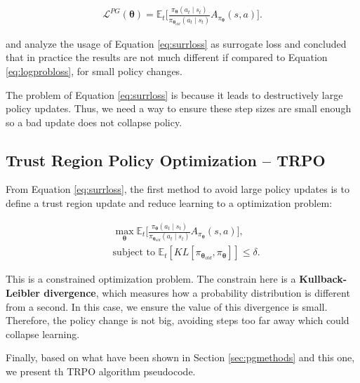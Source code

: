 \begin{eqnarray}\label{eq:surrloss}
\mathcal{L}^{PG}(\boldsymbol{\theta}) = \mathbb{E}_{t}\Big[\frac{\pi_{\boldsymbol{\theta}}(a_{t} \mid s_{t})}{\pi_{\boldsymbol{\theta}_{old}}(a_{t} \mid s_{t})}A_{\pi_{\boldsymbol{\theta}}}(s,a)\Big].
\end{eqnarray}

\citeauthor{trpo} and \citeauthor{Kakade02approximatelyoptimal} analyze the usage of Equation \eqref{eq:surrloss} as surrogate loss and concluded that in practice the results are not much different if compared to Equation \ref{eq:logprobloss}, for small policy changes.

The problem of Equation \eqref{eq:surrloss} is because it leads to destructively large policy updates. Thus, we need a way to ensure these step sizes are small enough so a bad update does not collapse policy.
\subsection{Trust Region Policy Optimization -- TRPO}

From Equation \ref{eq:surrloss}, the first method to avoid large policy updates is to define a trust region update and reduce learning to a optimization problem:

\begin{align}\label{eq:tr}
&  \max_{\boldsymbol{\theta}}  \mathbb{E}_{t}\Big[\frac{\pi_{\boldsymbol{\theta}}(a_{t} \mid s_{t})}{\pi_{\boldsymbol{\theta}_{old}}(a_{t} \mid s_{t})}A_{\pi_{\boldsymbol{\theta}}}(s,a)\Big],\\ &  \text{subject to }  \mathbb{E}_{t}[KL[\pi_{\boldsymbol{\theta}_{old}}, \pi_{\boldsymbol{\theta}}]] \leq \delta \nonumber.
\end{align}

This is a constrained optimization problem. The constrain here is a \textbf{Kullback-Leibler divergence}, which measures how a probability distribution is different from a second. In this case, we ensure the value of this divergence is small. Therefore, the policy change is not big, avoiding steps too far away which could collapse learning.

Finally, based on what have been shown in Section \ref{sec:pgmethods} and this one, we present th TRPO algorithm pseudocode.


